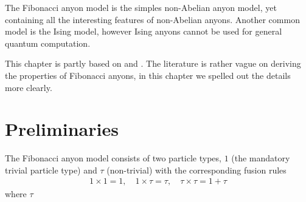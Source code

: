 \documentclass[a4paper,10pt,oneside]{book}
\theoremstyle{plain}
\theoremstyle{definition}
\theoremstyle{remark}
\begin{document}
The Fibonacci anyon model is the simples non-Abelian anyon model, yet containing all the interesting features of non-Abelian anyons. Another common model is the Ising model, however Ising anyons cannot be used for general quantum computation.

This chapter is partly based on \cite{preskill} and \cite{topological quantum compiling}. The literature is rather vague on deriving the properties of Fibonacci anyons, in this chapter we spelled out the details more clearly.

\section{Preliminaries}\label{sec:fibonacci fusion space examples}

The Fibonacci anyon model consists of two particle types, $1$ (the mandatory trivial particle type) and $τ$ (non-trivial) with the corresponding fusion rules
\begin{align*}
  1 \times 1 = 1, \quad
  1 \times τ = τ, \quad
  τ \times τ = 1 + τ
\end{align*}
where $\tau$
\end{document}
